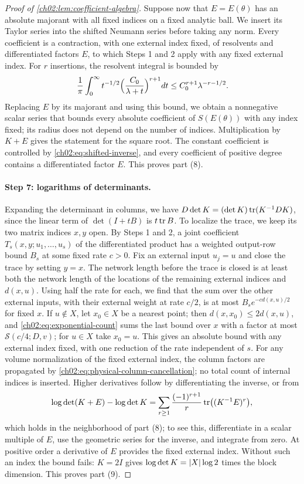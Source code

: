 \begin{proof}[Proof of \cref{ch02:lem:coefficient-algebra}]
Suppose now that $E=E(\theta)$ has an absolute majorant with all fixed indices on a fixed analytic ball. We insert its Taylor series into the shifted Neumann series before taking any norm. Every coefficient is a contraction, with one external index fixed, of resolvents and differentiated factors $E$, to which Steps 1 and 2 apply with any fixed external index. For $r$ insertions, the resolvent integral is bounded by
\[
 \frac1\pi\int_0^\infty t^{-1/2}\Bigl(\frac{C_0}{\lambda+t}\Bigr)^{r+1}dt\le C_0^{r+1}\lambda^{-r-1/2}.
\]
Replacing $E$ by its majorant and using this bound, we obtain a nonnegative scalar series that bounds every absolute coefficient of $S(E(\theta))$ with any index fixed; its radius does not depend on the number of indices. Multiplication by $K+E$ gives the statement for the square root. The constant coefficient is controlled by \eqref{ch02:eq:shifted-inverse}, and every coefficient of positive degree contains a differentiated factor $E$. This proves part (8).

\paragraph{Step 7: logarithms of determinants.} Expanding the determinant in columns, we have $D\det K=(\det K)\operatorname{tr}(K^{-1}DK)$, since the linear term of $\det(I+tB)$ is $t\operatorname{tr} B$. To localize the trace, we keep its two matrix indices $x,y$ open. By Steps 1 and 2, a joint coefficient $T_s(x,y;u_1,\dots,u_s)$ of the differentiated product has a weighted output-row bound $B_s$ at some fixed rate $c>0$. Fix an external input $u_j=u$ and close the trace by setting $y=x$. The network length before the trace is closed is at least both the network length of the locations of the remaining external indices and $d(x,u)$. Using half the rate for each, we find that the sum over the other external inputs, with their external weight at rate $c/2$, is at most $B_se^{-cd(x,u)/2}$ for fixed $x$. If $u\notin X$, let $x_0\in X$ be a nearest point; then $d(x,x_0)\le2d(x,u)$, and \eqref{ch02:eq:exponential-count} sums the last bound over $x$ with a factor at most $\mathcal S(c/4;D,v)$; for $u\in X$ take $x_0=u$. This gives an absolute bound with any external index fixed, with one reduction of the rate independent of $s$. For any volume normalization of the fixed external index, the column factors are propagated by \eqref{ch02:eq:physical-column-cancellation}; no total count of internal indices is inserted. Higher derivatives follow by differentiating the inverse, or from
\[
 \log\det(K+E)-\log\det K=\sum_{r\ge1}\frac{(-1)^{r+1}}r\operatorname{tr}\bigl((K^{-1}E)^r\bigr),
\]
which holds in the neighborhood of part (8); to see this, differentiate in a scalar multiple of $E$, use the geometric series for the inverse, and integrate from zero. At positive order a derivative of $E$ provides the fixed external index. Without such an index the bound fails: $K=2I$ gives $\log\det K=\lvert X\rvert\log2$ times the block dimension. This proves part (9).


\end{proof}
